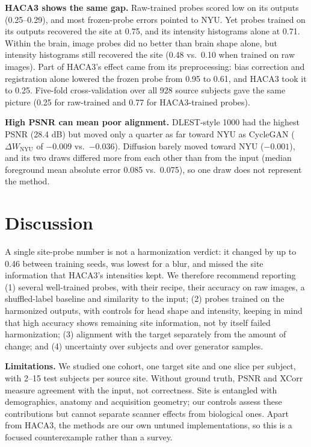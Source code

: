 \documentclass{article}
\begin{document}
\textbf{HACA3 shows the same gap.} Raw-trained probes scored low on its outputs (0.25--0.29), and most frozen-probe errors pointed to NYU. Yet probes trained on its outputs recovered the site at 0.75, and its intensity histograms alone at 0.71. Within the brain, image probes did no better than brain shape alone, but intensity histograms still recovered the site (0.48 vs.\ 0.10 when trained on raw images). Part of HACA3's effect came from its preprocessing: bias correction and registration alone lowered the frozen probe from 0.95 to 0.61, and HACA3 took it to 0.25. Five-fold cross-validation over all 928 source subjects gave the same picture (0.25 for raw-trained and 0.77 for HACA3-trained probes).

\textbf{High PSNR can mean poor alignment.} DLEST-style 1000 had the highest PSNR (28.4 dB) but moved only a quarter as far toward NYU as CycleGAN ($\Delta W_{\mathrm{NYU}}$ of $-0.009$ vs.\ $-0.036$). Diffusion barely moved toward NYU ($-0.001$), and its two draws differed more from each other than from the input (median foreground mean absolute error 0.085 vs.\ 0.075), so one draw does not represent the method.

\section{Discussion}
\label{sec:discussion}
A single site-probe number is not a harmonization verdict: it changed by up to 0.46 between training seeds, was lowest for a blur, and missed the site information that HACA3's intensities kept. We therefore recommend reporting (1) several well-trained probes, with their recipe, their accuracy on raw images, a shuffled-label baseline and similarity to the input; (2) probes trained on the harmonized outputs, with controls for head shape and intensity, keeping in mind that high accuracy shows remaining site information, not by itself failed harmonization; (3) alignment with the target separately from the amount of change; and (4) uncertainty over subjects and over generator samples.

\textbf{Limitations.} We studied one cohort, one target site and one slice per subject, with 2--15 test subjects per source site. Without ground truth, PSNR and XCorr measure agreement with the input, not correctness. Site is entangled with demographics, anatomy and acquisition geometry; our controls assess these contributions but cannot separate scanner effects from biological ones. Apart from HACA3, the methods are our own untuned implementations, so this is a focused counterexample rather than a survey.
\end{document}
